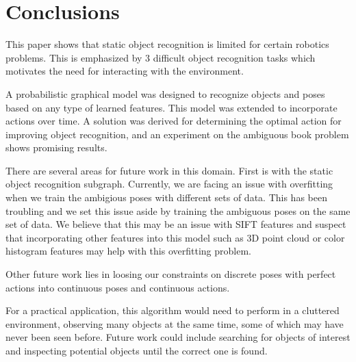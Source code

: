 \section{Conclusions}
    
    This paper shows that static object recognition is limited for certain robotics problems. This is emphasized by 3 difficult object recognition tasks which motivates the need for interacting with the environment. 

    A probabilistic graphical model was designed to recognize objects and poses based on any type of learned features. This model was extended to incorporate actions over time. A solution was derived for determining the optimal action for improving object recognition, and an experiment on the ambiguous book problem shows promising results.

    There are several areas for future work in this domain. First is with the static object recognition subgraph. Currently, we are facing an issue with overfitting when we train the ambigious poses with different sets of data. This has been troubling and we set this issue aside by training the ambiguous poses on the same set of data. We believe that this may be an issue with SIFT features and suspect that incorporating other features into this model such as 3D point cloud or color histogram features may help with this overfitting problem.

    Other future work lies in loosing our constraints on discrete poses with perfect actions into continuous poses and continuous actions. %

    For a practical application, this algorithm would need to perform in a cluttered environment, observing many objects at the same time, some of which may have never been seen before. Future work could include searching for objects of interest and inspecting potential objects until the correct one is found.

